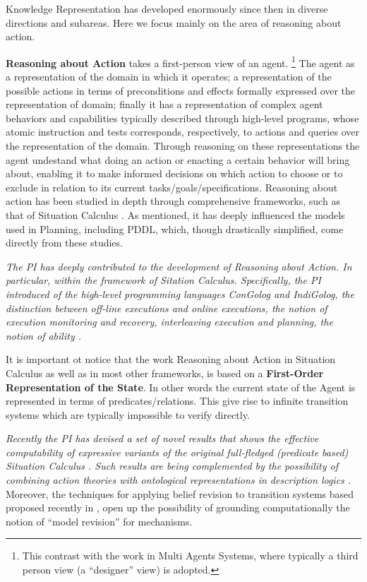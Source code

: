 Knowledge Representation has developed enormously since then in
diverse directions and subareas. Here we focus mainly on the area of reasoning about action.



\textbf{Reasoning about Action} takes a first-person view of an agent. %
\footnote{This contrast with the work in Multi Agents Systems, where
  typically a third person view (a ``designer'' view) is adopted.} %
The agent as a representation of the domain in which it operates;
a  representation of 
 the possible actions in terms of preconditions and effects formally expressed over the representation of domain;
finally it has a representation of  complex agent behaviors and capabilities typically  described through high-level programs, whose atomic instruction and tests corresponds, respectively, to actions and queries over the representation of the domain.
Through 
reasoning on these representations the agent undestand what doing an action or enacting a certain behavior will bring about, enabling it to make informed decisions on which action to choose or to exclude in relation to its current tasks/goals/specifications.
Reasoning about action has been studied in depth through
comprehensive frameworks, such as that of Situation Calculus \cite{McHa69,Reiter01}. 
As mentioned, it has deeply influenced the models used in Planning, including PDDL, which, though drastically simplified, come directly from these studies.


\emph{The PI has deeply contributed to the development of Reasoning about
Action. In particular, within the framework of Sitation Calculus. Specifically, the PI
introduced of the high-level programming languages
ConGolog and IndiGolog, the
distinction between off-line executions and online executions, the
notion of execution monitoring and recovery, interleaving execution
and planning, the notion of ability \cite{DeGiacomoRS98,DeGiacomoLL00,SardinaGLL04,SardinaGLL06}.}

It is important ot notice that the work Reasoning about Action in
Situation Calculus as well as in most other frameworks, is based on a
\textbf{First-Order Representation of the State}. In other words the
current state of the Agent is represented in terms of
predicates/relations.  This give rise to infinite transition systems
which are typically impossible to verify directly.

\emph{Recently the PI has devised a set of novel results
that shows the effective computability of expressive variants of the
original full-fledged (predicate based) Situation Calculus \cite{DeGiacomoLPV14,DeGiacomoLPV16,DeGiacomoLPS16,BanihashemiGL17,CDMP17}. Such results are being complemented by the
possibility of combining action theories with ontological
representations in description logics \cite{CalvaneseGLR07,CalvaneseGLMS12,HaririCMGMF13,CalvaneseGS15}.} Moreover, the techniques for applying belief revision to
transition systems based proposed
recently in \cite{HerzigMBW14,CarrilloR14}, open up the possibility of grounding
computationally the notion of ``model revision'' for mechanisms.

